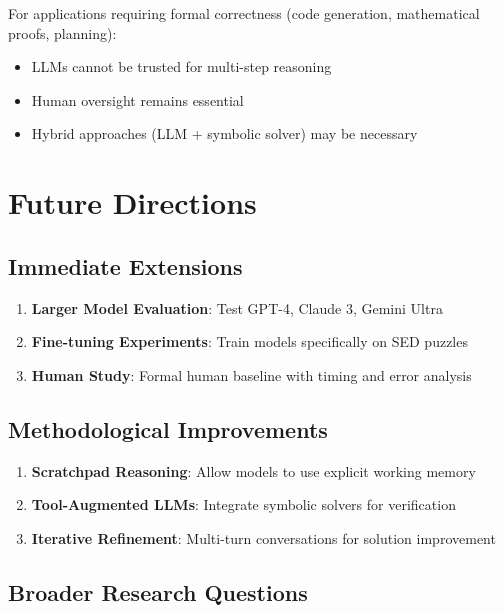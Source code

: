 \documentclass[11pt,a4paper]{article}
\begin{document}
For applications requiring formal correctness (code generation, mathematical proofs, planning):
\begin{itemize}
    \item LLMs cannot be trusted for multi-step reasoning
    \item Human oversight remains essential
    \item Hybrid approaches (LLM + symbolic solver) may be necessary
\end{itemize}

\section{Future Directions}

\subsection{Immediate Extensions}

\begin{enumerate}
    \item \textbf{Larger Model Evaluation}: Test GPT-4, Claude 3, Gemini Ultra
    \item \textbf{Fine-tuning Experiments}: Train models specifically on SED puzzles
    \item \textbf{Human Study}: Formal human baseline with timing and error analysis
\end{enumerate}

\subsection{Methodological Improvements}

\begin{enumerate}
    \item \textbf{Scratchpad Reasoning}: Allow models to use explicit working memory
    \item \textbf{Tool-Augmented LLMs}: Integrate symbolic solvers for verification
    \item \textbf{Iterative Refinement}: Multi-turn conversations for solution improvement
\end{enumerate}

\subsection{Broader Research Questions}
\end{document}
